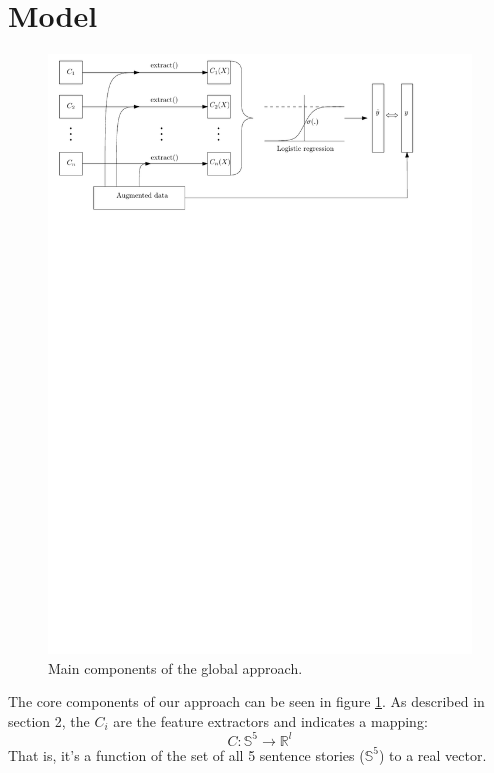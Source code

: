 \documentclass{article}
\begin{document}
\section{Model}

	\begin{figure}[h!]
		\centering
		\includegraphics[scale=0.8]{fig/logistic_fitting.pdf}
		\caption{Main components of the global approach.}
		\label{Main}
	\end{figure}

The core components of our approach can be seen in figure \ref*{Main}. As described in section 2, the $C_i$ are the feature extractors and indicates a mapping:
\begin{equation}
C: \mathbb{S}^5 \rightarrow \mathbb{R}^l
\end{equation}
That is, it's a function of the set of all 5 sentence stories ($\mathbb{S}^5$) to a real vector.
\end{document}
